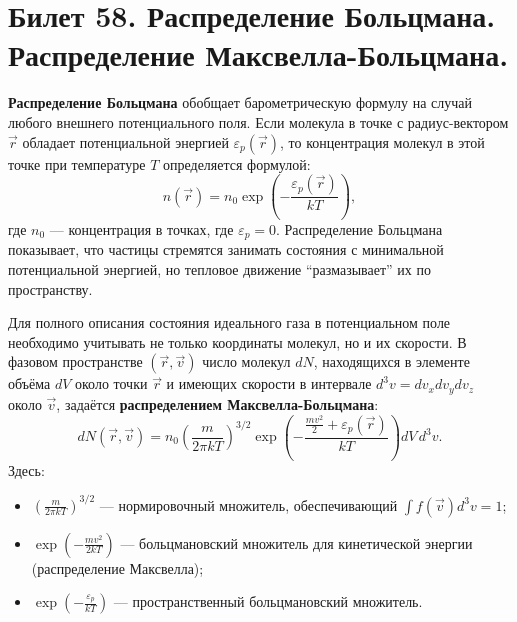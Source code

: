 \section{Билет 58. Распределение Больцмана. Распределение Максвелла-Больцмана.}

\begin{definition}
\textbf{Распределение Больцмана} обобщает барометрическую формулу на случай любого внешнего потенциального поля. Если молекула в точке с радиус-вектором $\vec{r}$ обладает потенциальной энергией $\varepsilon_p(\vec{r})$, то концентрация молекул в этой точке при температуре $T$ определяется формулой:
\begin{equation}
    n(\vec{r}) = n_0 \exp\left(-\frac{\varepsilon_p(\vec{r})}{kT}\right), \label{eq:boltzmann_dist}
\end{equation}
где $n_0$ --- концентрация в точках, где $\varepsilon_p = 0$. Распределение Больцмана показывает, что частицы стремятся занимать состояния с минимальной потенциальной энергией, но тепловое движение ``размазывает'' их по пространству.
\end{definition}

\begin{theorem}
Для полного описания состояния идеального газа в потенциальном поле необходимо учитывать не только координаты молекул, но и их скорости. В фазовом пространстве $(\vec{r}, \vec{v})$ число молекул $dN$, находящихся в элементе объёма $dV$ около точки $\vec{r}$ и имеющих скорости в интервале $d^3v = dv_x dv_y dv_z$ около $\vec{v}$, задаётся \textbf{распределением Максвелла-Больцмана}:
\begin{equation}
    dN(\vec{r}, \vec{v}) = n_0 \left( \frac{m}{2\pi kT} \right)^{3/2} \exp\left(-\frac{\frac{mv^2}{2} + \varepsilon_p(\vec{r})}{kT}\right) dV \, d^3v. \label{eq:maxwell_boltzmann}
\end{equation}
Здесь:
\begin{itemize}
    \item $\left( \frac{m}{2\pi kT} \right)^{3/2}$ --- нормировочный множитель, обеспечивающий $\int f(\vec{v}) d^3v = 1$;
    \item $\exp\left(-\frac{mv^2}{2kT}\right)$ --- больцмановский множитель для кинетической энергии (распределение Максвелла);
    \item $\exp\left(-\frac{\varepsilon_p}{kT}\right)$ --- пространственный больцмановский множитель.
\end{itemize}
\end{theorem}


